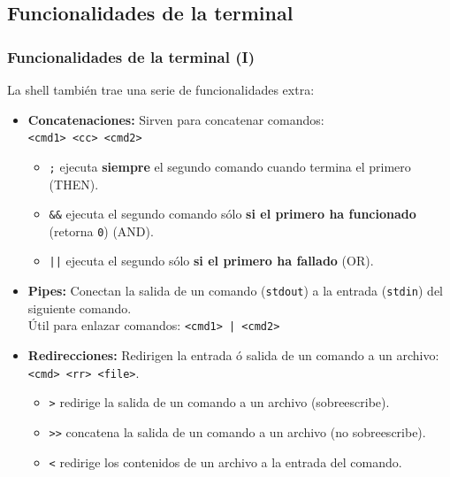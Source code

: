\documentclass[aspectratio=43]{beamer}
\begin{document}
\subsection{Funcionalidades de la terminal}

\begin{frame}
    \frametitle{Funcionalidades de la terminal (I)}
    La shell también trae una serie de funcionalidades extra:

    \begin{itemize}
        \item \textbf{Concatenaciones:} Sirven para concatenar comandos:\\
        \texttt{<cmd1> <cc> <cmd2>}\\
        \begin{itemize}
            \item \texttt{;} ejecuta \textbf{siempre} el segundo comando cuando termina el primero (THEN).
            \item \texttt{\&\&} ejecuta el segundo comando sólo \textbf{si el primero ha funcionado} (retorna \texttt{0}) (AND).
            \item \texttt{||} ejecuta el segundo sólo \textbf{si el primero ha fallado} (OR).
        \end{itemize}
        \item \textbf{Pipes:} Conectan la salida de un comando (\texttt{stdout}) a la entrada (\texttt{stdin}) del siguiente comando. \\
        Útil para enlazar comandos: \texttt{<cmd1> | <cmd2>}
        \item \textbf{Redirecciones:} Redirigen la entrada ó salida de un comando a un archivo: \texttt{<cmd> <rr> <file>}.
        \begin{itemize}
            \item \texttt{>} redirige la salida de un comando a un archivo (sobreescribe).
            \item \texttt{>>} concatena la salida de un comando a un archivo (no sobreescribe).
            \item \texttt{<} redirige los contenidos de un archivo a la entrada del comando.
        \end{itemize} 

    \end{itemize}

\end{frame}
\end{document}

